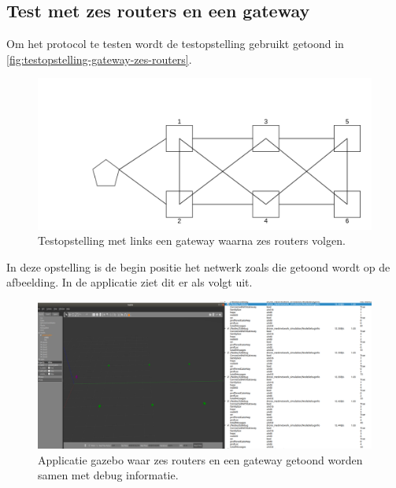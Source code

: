 \documentclass[a4paper, 11pt, oneside]{report}
\begin{document}
\subsection{Test met zes routers en een gateway}

Om het protocol te testen wordt de testopstelling gebruikt getoond in \autoref{fig:testopstelling-gateway-zes-routers}.

\begin{figure}[H]
	\begin{center}\includegraphics[width=1\linewidth]{Afbeeldingen/testopstelling1.png}\end{center}
	\caption{Testopstelling met links een gateway waarna zes routers volgen.}
	\label{fig:testopstelling-gateway-zes-routers}
\end{figure}

In deze opstelling is de begin positie het netwerk zoals die getoond wordt op de afbeelding.
In de applicatie ziet dit er als volgt uit.


\begin{figure}[H]
	\begin{center}\includegraphics[width=1\linewidth]{Afbeeldingen/testopstellingmetzes_debug_info_fusion.png}\end{center}
	\caption{Applicatie gazebo waar zes routers en een gateway getoond worden samen met debug informatie.}
	\label{fig:applicatie-testopstelling-gateway-zes-routers}
\end{figure}  
\end{document}
